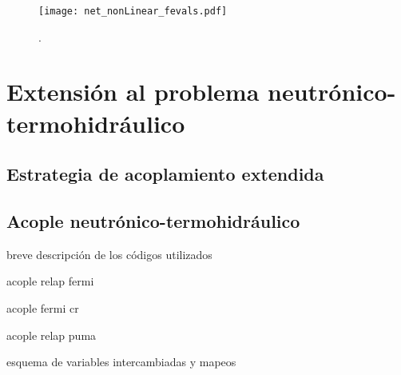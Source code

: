 \begin{figure}[ht]
\centering
\texttt{[image: net\_nonLinear\_fevals.pdf]}
\caption{.}  
	\label{net_nonLinear_fevals}
\end{figure}

\section{Extensión al problema neutrónico-termohidráulico}
\label{3:nt}


\subsection*{Estrategia de acoplamiento extendida}
\label{3:strategy-extended}


\subsection{Acople neutrónico-termohidráulico}
\label{3:neut-th}
breve descripción de los códigos utilizados

acople relap fermi

acople fermi cr

acople relap puma

esquema de variables intercambiadas y mapeos
